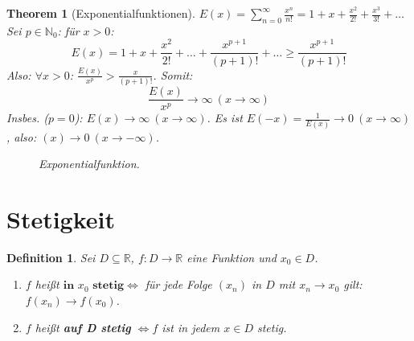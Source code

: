 \documentclass[14pt,titlepage,ngerman,a4paper,headsepline,DIV15,halfparskip*]{scrartcl}
\newcommand{\N}{\mathbb{N}}
\newcommand{\R}{\mathbb{R}}
\theoremstyle{named}
\newtheorem{namedtheorem}{Theorem} \counterwithin{namedtheorem}{section}
\theoremstyle{dotless}
\newtheorem*{definition}{Definition}
\begin{document}
\begin{namedtheorem}[Exponentialfunktionen] \label{6.4:prop-Exponentialfunktionen}
	$E(x) = \sum_{n=0}^{\infty} \frac{x^{n}}{n!} = 1 + x + \frac{x^{2}}{2!} + \frac{x^{3}}{3!} + \dotsc$ \\
	Sei $p \in \N_{0}$: für $x > 0$:
		$$ E(x) = 1 + x + \frac{x^{2}}{2!} + \dotsc + \frac{x^{p+1}}{(p+1)!} + \dotsc \geq \frac{x^{p+1}}{(p+1)!} $$
	Also: $\forall x > 0$: $\frac{E(x)}{x^{p}} > \frac{x}{(p+1)!}$.
	Somit:
		$$ \frac{E(x)}{x^{p}} \rightarrow \infty ~(x \rightarrow \infty) $$
	Insbes. ($p = 0$): $E(x) \rightarrow \infty ~(x \rightarrow \infty)$. Es ist $E(-x) = \frac{1}{E(x)} \rightarrow 0 ~(x \rightarrow \infty)$, also: $(x) \rightarrow  0 ~(x \rightarrow -\infty)$.
	\begin{figure*}[!ht] \centering
		\caption{Exponentialfunktion.}	
	\end{figure*}
\end{namedtheorem}


\newpage


\section{Stetigkeit}

\begin{definition}
	Sei $D \subseteq \R$, $f \colon D \rightarrow \R$ eine Funktion und $x_{0} \in D$. 
	\begin{enumerate}
		\item $f$ hei{\ss}t $\textbf{in }  x_{0} \textbf{ stetig} \iff$ für jede Folge $(x_{n})$ in $D$ mit $x_{n} \rightarrow x_{0}$ gilt: $f(x_{n}) \rightarrow f(x_{0})$.
		\item $f$ hei{\ss}t \textbf{auf D stetig} $\iff f$ ist in jedem $x \in D$ stetig.
	\end{enumerate}
\end{definition}
\end{document}
